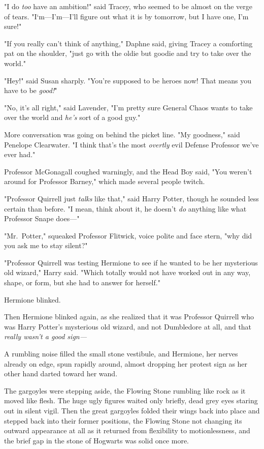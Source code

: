 "I do \emph{too} have an ambition!" said Tracey, who seemed to be almost on the
verge of tears. "I`m---I'm---I'll figure out what it is by tomorrow, but I have
one, I'm sure!"

"If you really can't think of anything," Daphne said, giving Tracey a
comforting pat on the shoulder, "just go with the oldie but goodie and try to
take over the world."

"Hey!" said Susan sharply. "You're supposed to be heroes now! That means you
have to be \emph{good!}"

"No, it's all right," said Lavender, "I'm pretty sure General Chaos wants to
take over the world and \emph{he's} sort of a good guy."

More conversation was going on behind the picket line. "My goodness," said
Penelope Clearwater. "I think that's the most \emph{overtly} evil Defense
Professor we've ever had."

Professor McGonagall coughed warningly, and the Head Boy said, "You weren't
around for Professor Barney," which made several people twitch.

"Professor Quirrell just \emph{talks} like that," said Harry Potter, though he
sounded less certain than before. "I mean, think about it, he doesn't \emph{do}
anything like what Professor Snape does---"

"Mr.~Potter," squeaked Professor Flitwick, voice polite and face stern, "why
did you ask me to stay silent?"

"Professor Quirrell was testing Hermione to see if he wanted to be her
mysterious old wizard," Harry said. "Which totally would not have worked out in
any way, shape, or form, but she had to answer for herself."

Hermione blinked.

Then Hermione blinked again, as she realized that it was Professor Quirrell who
was Harry Potter's mysterious old wizard, and not Dumbledore at all, and that
\emph{really wasn't a good sign---}

A rumbling noise filled the small stone vestibule, and Hermione, her nerves
already on edge, spun rapidly around, almost dropping her protest sign as her
other hand darted toward her wand.

The gargoyles were stepping aside, the Flowing Stone rumbling like rock as it
moved like flesh. The huge ugly figures waited only briefly, dead grey eyes
staring out in silent vigil. Then the great gargoyles folded their wings back
into place and stepped back into their former positions, the Flowing Stone not
changing its outward appearance at all as it returned from flexibility to
motionlessness, and the brief gap in the stone of Hogwarts was solid once more.

